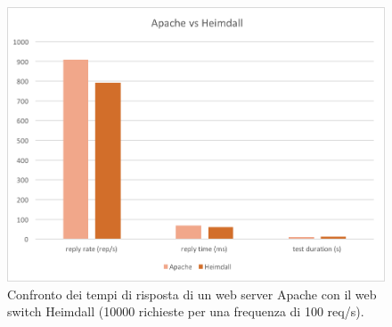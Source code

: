 \documentclass[italian]{tktltiki2}
\begin{document}
\begin{figure}[H]
\centering
\includegraphics[width=\textwidth]{images/apachevsheimdall}
\caption{Confronto dei tempi di risposta di un web server Apache con il web switch Heimdall (10000 richieste per una frequenza di 100 req/s).\label{fig: apachevsheimdall}}
\end{figure}
\end{document}
